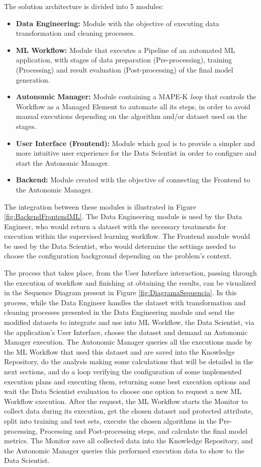 \documentclass[sigconf]{acmart}
\begin{document}
The solution architecture is divided into 5 modules:

\begin{itemize}
    \item {\textbf{Data Engineering:}} Module with the objective of executing data transformation and cleaning processes.
	\item {\textbf{ML Workflow:}} Module that executes a Pipeline of an automated ML application, with stages of data preparation (Pre-processing), training (Processing) and result evaluation (Post-processing) of the final model generation.
     \item {\textbf{Autonomic Manager:}} Module containing a MAPE-K \textit{loop} that controls the Workflow as a Managed Element to automate all its steps, in order to avoid manual executions depending on the algorithm and/or dataset used on the stages.
     \item {\textbf{User Interface (Frontend):}} Module which goal is to provide a simpler and more intuitive user experience for the Data Scientist in order to configure and start the Autonomic Manager.
	\item {\textbf{Backend:}} Module created with the objective of connecting the Frontend to the Autonomic Manager.
\end{itemize}

The integration between these modules is illustrated in Figure \ref{fig:BackendFrontendML}. The Data Engineering module is used by the Data Engineer, who would return a dataset with the necessary treatments for execution within the supervised learning workflow. The Frontend module would be used by the Data Scientist, who would determine the settings needed to choose the configuration background depending on the problem's context. 

The process that takes place, from the User Interface interaction, passing through the execution of workflow and finishing at obtaining the results, can be visualized in the Sequence Diagram present in Figure \ref{fig:DiagramaSequencia}. In this process, while the Data Engineer handles the dataset with transformation and cleaning processes presented in the Data Engineering module and send the modified datasets to integrate and use into ML Workflow, the Data Scientist, via the application's User Interface, choose the dataset and demand an Autonomic Manager execution. The Autonomic Manager queries all the executions made by the ML Workflow that used this dataset and are saved into the Knowledge Repository, do the analysis making some calculations that will be detailed in the next sections, and do a loop verifying the configuration of some implemented execution plans and executing them, returning some best execution options and wait the Data Scientist evaluation to choose one option to request a new ML Workflow execution. After the request, the ML Workflow starts the Monitor to collect data during its execution, get the chosen dataset and protected attribute, split into training and test sets, execute the chosen algorithms in the Pre-processing, Processing and Post-processing steps, and calculate the final model metrics. The Monitor save all collected data into the Knowledge Repository, and the Autonomic Manager queries this performed execution data to show to the Data Scientist.
\end{document}
